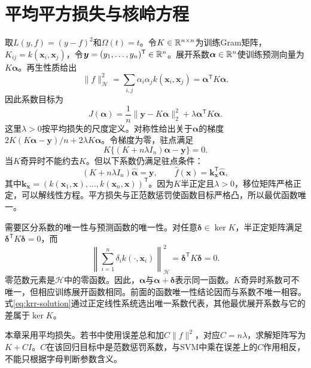 \section{平均平方损失与核岭方程}
取$L(y,f)=(y-f)^2$和$\Omega(t)=t$。令$K\in\mathbb{R}^{n\times n}$为训练Gram矩阵，$K_{ij}=k(\bm x_i,\bm x_j)$，令$\bm y=(y_1,\ldots,y_n)^{\mathsf T}\in\mathbb{R}^n$。展开系数$\bm\alpha\in\mathbb{R}^n$使训练预测向量为$K\bm\alpha$。再生性质给出
\begin{equation}
 \|f\|_{\mathcal H}^2
 =\sum_{i,j}\alpha_i\alpha_jk(\bm x_i,\bm x_j)
 =\bm\alpha^{\mathsf T}K\bm\alpha.
\end{equation}
因此系数目标为
\begin{equation}
 J(\bm\alpha)=\frac1n\|\bm y-K\bm\alpha\|_2^2
 +\lambda\bm\alpha^{\mathsf T}K\bm\alpha.
 \label{eq:krr-coefficient-objective}
\end{equation}
这里$\lambda>0$按平均损失的尺度定义。对称性给出关于$\bm\alpha$的梯度$2K(K\bm\alpha-\bm y)/n+2\lambda K\bm\alpha$。令梯度为零，驻点满足
\begin{equation}
 K\{(K+n\lambda I_n)\bm\alpha-\bm y\}=0.
\end{equation}
当$K$奇异时不能约去$K$。但以下系数仍满足驻点条件：
\begin{equation}
 (K+n\lambda I_n)\hat{\bm\alpha}=\bm y,
 \qquad \hat f(\bm x)=\bm k_{\bm x}^{\mathsf T}\hat{\bm\alpha},
 \label{eq:krr-solution}
\end{equation}
其中$\bm k_{\bm x}=(k(\bm x_1,\bm x),\ldots,k(\bm x_n,\bm x))^{\mathsf T}$。因为$K$半正定且$\lambda>0$，移位矩阵严格正定，可以解线性方程。平方损失与正范数惩罚使函数目标严格凸，所以最优函数唯一。

需要区分系数的唯一性与预测函数的唯一性。对任意$\bm\delta\in\ker K$，半正定矩阵满足$\bm\delta^{\mathsf T}K\bm\delta=0$，而
\[
 \left\|\sum_{i=1}^n\delta_i k(\cdot,\bm x_i)\right\|_{\mathcal H}^2=\bm\delta^{\mathsf T}K\bm\delta=0.
\]
零范数元素是$\mathcal H$中的零函数。因此，$\bm\alpha$与$\bm\alpha+\bm\delta$表示同一函数。$K$奇异时系数可不唯一，但相应训练展开函数相同。前面的函数唯一性结论因而与系数不唯一相容。式\eqref{eq:krr-solution}通过正定线性系统选出唯一系数代表，其他最优展开系数与它的差属于$\ker K$。

本章采用平均损失。若书中使用误差总和加$C\|f\|^2$，对应$C=n\lambda$，求解矩阵写为$K+CI$。$C$在该回归目标中是范数惩罚系数，与SVM中乘在误差上的$C$作用相反，不能只根据字母判断参数含义。

